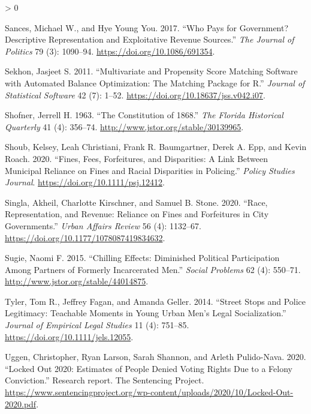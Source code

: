 \documentclass[
  12pt,
]{article}
\newlength{\cslhangindent}
\newenvironment{CSLReferences}[2] %
 {%
  \setlength{\parindent}{0pt}
  \ifodd #1 \everypar{\setlength{\hangindent}{\cslhangindent}}\ignorespaces\fi
  \ifnum #2 > 0
  \setlength{\parskip}{#2\baselineskip}
  \fi
 }%
 {}
\begin{document}
\begin{CSLReferences}{1}{0}
\leavevmode\hypertarget{ref-Sances2017}{}%
Sances, Michael W., and Hye Young You. 2017. {``Who {Pays} for {Government}? {Descriptive Representation} and {Exploitative Revenue Sources}.''} \emph{The Journal of Politics} 79 (3): 1090--94. \url{https://doi.org/10.1086/691354}.

\leavevmode\hypertarget{ref-Sekhon2011}{}%
Sekhon, Jasjeet S. 2011. {``Multivariate and {Propensity Score Matching Software} with {Automated Balance Optimization}: {The Matching} Package for {R}.''} \emph{Journal of Statistical Software} 42 (7): 1--52. \url{https://doi.org/10.18637/jss.v042.i07}.

\leavevmode\hypertarget{ref-Shofner1963}{}%
Shofner, Jerrell H. 1963. {``The {Constitution} of 1868.''} \emph{The Florida Historical Quarterly} 41 (4): 356--74. \url{http://www.jstor.org/stable/30139965}.

\leavevmode\hypertarget{ref-Shoub2020}{}%
Shoub, Kelsey, Leah Christiani, Frank R. Baumgartner, Derek A. Epp, and Kevin Roach. 2020. {``Fines, {Fees}, {Forfeitures}, and {Disparities}: {A Link Between Municipal Reliance} on {Fines} and {Racial Disparities} in {Policing}.''} \emph{Policy Studies Journal}. \url{https://doi.org/10.1111/psj.12412}.

\leavevmode\hypertarget{ref-Singla2020}{}%
Singla, Akheil, Charlotte Kirschner, and Samuel B. Stone. 2020. {``Race, {Representation}, and {Revenue}: {Reliance} on {Fines} and {Forfeitures} in {City Governments}.''} \emph{Urban Affairs Review} 56 (4): 1132--67. \url{https://doi.org/10.1177/1078087419834632}.

\leavevmode\hypertarget{ref-Sugie2015}{}%
Sugie, Naomi F. 2015. {``Chilling {Effects}: {Diminished Political Participation} Among {Partners} of {Formerly Incarcerated Men}.''} \emph{Social Problems} 62 (4): 550--71. \url{http://www.jstor.org/stable/44014875}.

\leavevmode\hypertarget{ref-Tyler2014}{}%
Tyler, Tom R., Jeffrey Fagan, and Amanda Geller. 2014. {``Street {Stops} and {Police Legitimacy}: {Teachable Moments} in {Young Urban Men}'s {Legal Socialization}.''} \emph{Journal of Empirical Legal Studies} 11 (4): 751--85. \url{https://doi.org/10.1111/jels.12055}.

\leavevmode\hypertarget{ref-Uggen2020}{}%
Uggen, Christopher, Ryan Larson, Sarah Shannon, and Arleth Pulido-Nava. 2020. {``Locked {Out} 2020: {Estimates} of {People Denied Voting Rights Due} to a {Felony Conviction}.''} Research report. {The Sentencing Project}. \url{https://www.sentencingproject.org/wp-content/uploads/2020/10/Locked-Out-2020.pdf}.


\end{CSLReferences}
\end{document}
